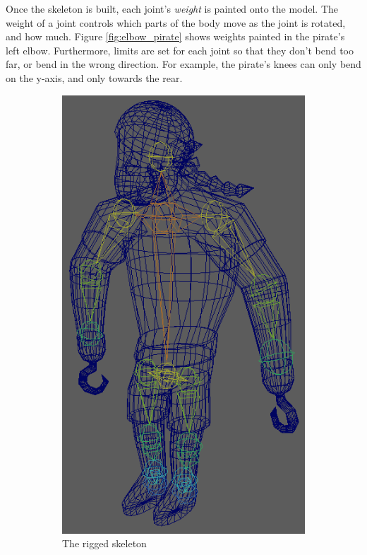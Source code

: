 Once the skeleton is built, each joint's \textit{weight} is painted onto the model. The weight of a joint controls which parts of the body move as the joint is rotated, and how much. Figure \ref{fig:elbow_pirate} shows weights painted in the pirate's left elbow. Furthermore, limits are set for each joint so that they don't bend too far, or bend in the wrong direction. For example, the pirate's knees can only bend on the y-axis, and only towards the rear.

\begin{figure}[h!]
	\centering
	\begin{subfigure}[b]{0.45\textwidth}
		\centering
		\includegraphics[scale=0.6]{figures/rigged_pirate.png}
		\caption{The rigged skeleton}
		\label{fig:rigged_pirate}
	\end{subfigure}
	\begin{subfigure}[b]{0.45\textwidth}
		\centering

\end{subfigure}
\end{figure}
